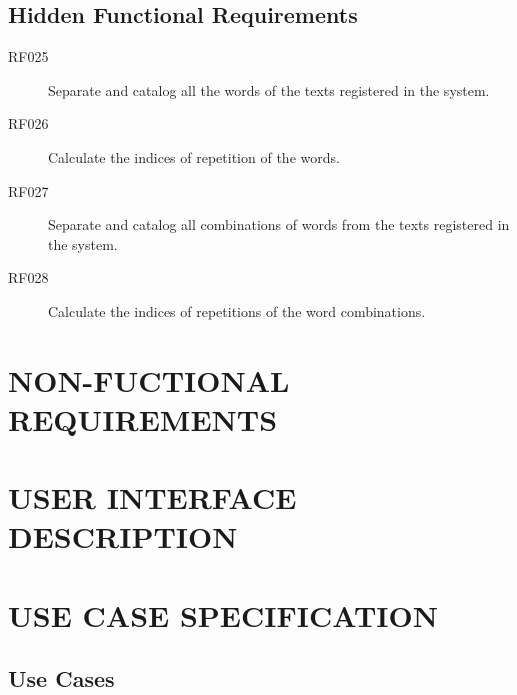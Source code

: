 \documentclass[11pt, twoside, a4paper]{book}
\begin{document}
		\section{Hidden Functional Requirements}
			
			\begin{description}

				\item[RF025] Separate and catalog all the words of the texts registered in the system.
				\item[RF026] Calculate the indices of repetition of the words.
				\item[RF027] Separate and catalog all combinations of words from the texts registered in the system.
				\item[RF028] Calculate the indices of repetitions of the word combinations.

			\end{description}
		
	\chapter{NON-FUCTIONAL REQUIREMENTS}
	
	\chapter{USER INTERFACE DESCRIPTION}

	\chapter{USE CASE SPECIFICATION}

		\section{Use Cases}
				
\end{document}
